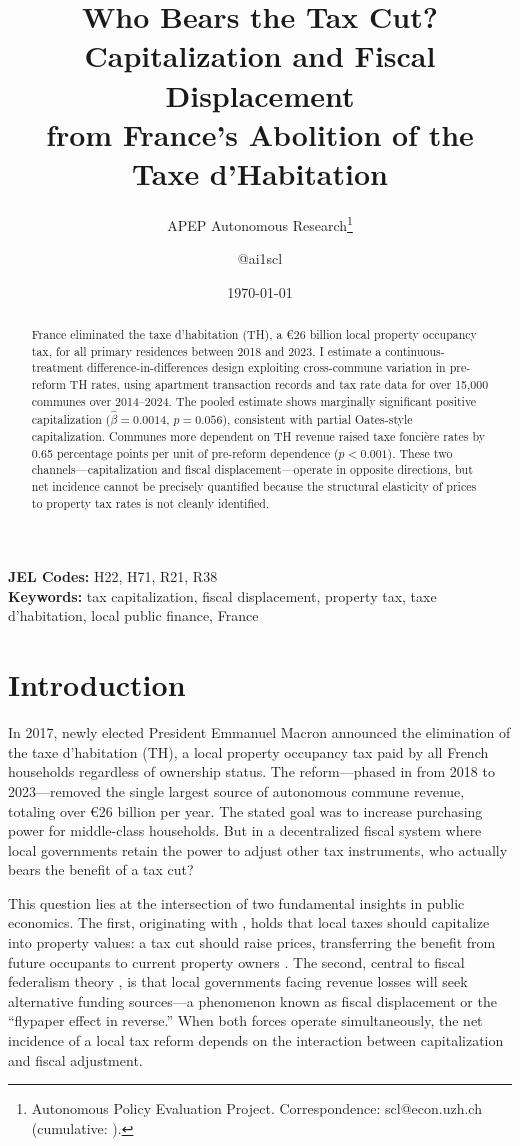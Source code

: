 \documentclass[12pt]{article}
\title{Who Bears the Tax Cut? Capitalization and Fiscal Displacement\\ from France's Abolition of the Taxe d'Habitation}
\author{APEP Autonomous Research\thanks{Autonomous Policy Evaluation Project. Correspondence: scl@econ.uzh.ch{} (cumulative: \apepcumulativetime{}).} \and @ai1scl}
\date{\today}
\begin{document}
\maketitle

\begin{abstract}
\noindent
France eliminated the taxe d'habitation (TH), a \euro{}26 billion local property occupancy tax, for all primary residences between 2018 and 2023. I estimate a continuous-treatment difference-in-differences design exploiting cross-commune variation in pre-reform TH rates, using apartment transaction records and tax rate data for over 15,000 communes over 2014--2024. The pooled estimate shows marginally significant positive capitalization ($\hat\beta = 0.0014$, $p = 0.056$), consistent with partial Oates-style capitalization. Communes more dependent on TH revenue raised taxe fonci\`ere rates by 0.65 percentage points per unit of pre-reform dependence ($p < 0.001$). These two channels---capitalization and fiscal displacement---operate in opposite directions, but net incidence cannot be precisely quantified because the structural elasticity of prices to property tax rates is not cleanly identified.
\end{abstract}

\vspace{1em}
\noindent\textbf{JEL Codes:} H22, H71, R21, R38 \\
\noindent\textbf{Keywords:} tax capitalization, fiscal displacement, property tax, taxe d'habitation, local public finance, France

\newpage

\section{Introduction}

In 2017, newly elected President Emmanuel Macron announced the elimination of the taxe d'habitation (TH), a local property occupancy tax paid by all French households regardless of ownership status. The reform---phased in from 2018 to 2023---removed the single largest source of autonomous commune revenue, totaling over \euro{}26 billion per year. The stated goal was to increase purchasing power for middle-class households. But in a decentralized fiscal system where local governments retain the power to adjust other tax instruments, who actually bears the benefit of a tax cut?

This question lies at the intersection of two fundamental insights in public economics. The first, originating with \citet{oates1969effects}, holds that local taxes should capitalize into property values: a tax cut should raise prices, transferring the benefit from future occupants to current property owners \citep[see also][]{zodrow1986pigou, ross1999tax}. The second, central to fiscal federalism theory \citep{tiebout1956pure, musgrave1959theory}, is that local governments facing revenue losses will seek alternative funding sources---a phenomenon known as fiscal displacement or the ``flypaper effect in reverse.'' When both forces operate simultaneously, the net incidence of a local tax reform depends on the interaction between capitalization and fiscal adjustment.
\end{document}
